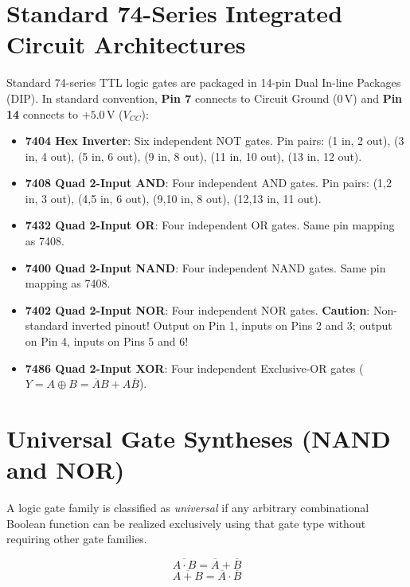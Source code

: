 \section{Standard 74-Series Integrated Circuit Architectures}
\begin{definition}
Standard 74-series TTL logic gates are packaged in 14-pin Dual In-line Packages (DIP). In standard convention, \textbf{Pin 7} connects to Circuit Ground ($0\,\mathrm{V}$) and \textbf{Pin 14} connects to $+5.0\,\mathrm{V}$ ($V_{CC}$):
\begin{itemize}
    \item \textbf{7404 Hex Inverter}: Six independent NOT gates. Pin pairs: (1 in, 2 out), (3 in, 4 out), (5 in, 6 out), (9 in, 8 out), (11 in, 10 out), (13 in, 12 out).
    \item \textbf{7408 Quad 2-Input AND}: Four independent AND gates. Pin pairs: (1,2 in, 3 out), (4,5 in, 6 out), (9,10 in, 8 out), (12,13 in, 11 out).
    \item \textbf{7432 Quad 2-Input OR}: Four independent OR gates. Same pin mapping as 7408.
    \item \textbf{7400 Quad 2-Input NAND}: Four independent NAND gates. Same pin mapping as 7408.
    \item \textbf{7402 Quad 2-Input NOR}: Four independent NOR gates. \textbf{Caution}: Non-standard inverted pinout! Output on Pin 1, inputs on Pins 2 and 3; output on Pin 4, inputs on Pins 5 and 6!
    \item \textbf{7486 Quad 2-Input XOR}: Four independent Exclusive-OR gates ($Y = A \oplus B = \overline{A}B + A\overline{B}$).
\end{itemize}
\end{definition}

\section{Universal Gate Syntheses (NAND and NOR)}
A logic gate family is classified as \textit{universal} if any arbitrary combinational Boolean function can be realized exclusively using that gate type without requiring other gate families.

\begin{theorem}
\[ \overline{A \cdot B} = \overline{A} + \overline{B} \]
\[ \overline{A + B} = \overline{A} \cdot \overline{B} \]
\end{theorem}

